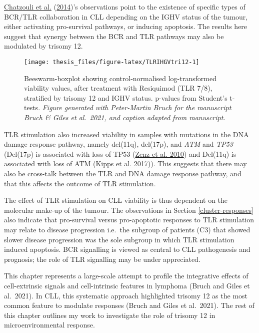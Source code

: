 \documentclass[11pt, a4paper, twosided]{book}
\begin{document}
\protect\hyperlink{ref-Chatzouli2014}{Chatzouli et al.} (\protect\hyperlink{ref-Chatzouli2014}{2014})'s observations point to the existence of specific types of BCR/TLR collaboration in CLL depending on the IGHV status of the tumour, either activating pro-survival pathways, or inducing apoptosis. The results here suggest that synergy between the BCR and TLR pathways may also be modulated by trisomy 12.


\begin{figure}

{\centering \texttt{[image: thesis\_files/figure-latex/TLRIHGVtri12-1]} 

}

\caption{Beeswarm-boxplot showing control-normalised log-transformed viability values, after treatment with Resiquimod (TLR 7/8), stratified by trisomy 12 and IGHV status. p-values from Student's t-tests. \emph{Figure generated with Peter-Martin Bruch for the manuscript Bruch \& Giles et al.~2021, and caption adapted from manuscript.}}\label{fig:TLRIHGVtri12}
\end{figure}
TLR stimulation also increased viability in samples with mutations in the DNA damage response pathway, namely del(11q), del(17p), and \emph{ATM} and \emph{TP53} (Del(17p) is associated with loss of TP53 (\protect\hyperlink{ref-Zenz2010}{Zenz et al. 2010}) and Del(11q) is associated with loss of ATM (\protect\hyperlink{ref-Kipps2017}{Kipps et al. 2017})). This suggests that there may also be cross-talk between the TLR and DNA damage response pathway, and that this affects the outcome of TLR stimulation.

The effect of TLR stimulation on CLL viability is thus dependent on the molecular make-up of the tumour. The observations in Section \ref{cluster-responses} also indicate that pro-survival versus pro-apoptotic responses to TLR stimulation may relate to disease progression i.e.~the subgroup of patients (C3) that showed slower disease progression was the sole subgroup in which TLR stimulation induced apoptosis. BCR signalling is viewed as central to CLL pathogenesis and prognosis; the role of TLR signalling may be under appreciated.

This chapter represents a large-scale attempt to profile the integrative effects of cell-extrinsic signals and cell-intrinsic features in lymphoma (Bruch and Giles et al.~2021). In CLL, this systematic approach highlighted trisomy 12 as the most common feature to modulate responses (Bruch and Giles et al.~2021). The rest of this chapter outlines my work to investigate the role of trisomy 12 in microenvironmental response.
\end{document}
